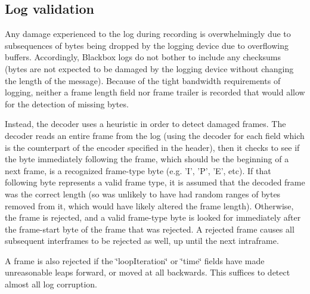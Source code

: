 \subsection*{Log validation}

Any damage experienced to the log during recording is overwhelmingly due to subsequences of bytes being dropped by the logging device due to overflowing buffers. Accordingly, Blackbox logs do not bother to include any checksums (bytes are not expected to be damaged by the logging device without changing the length of the message). Because of the tight bandwidth requirements of logging, neither a frame length field nor frame trailer is recorded that would allow for the detection of missing bytes.

Instead, the decoder uses a heuristic in order to detect damaged frames. The decoder reads an entire frame from the log (using the decoder for each field which is the counterpart of the encoder specified in the header), then it checks to see if the byte immediately following the frame, which should be the beginning of a next frame, is a recognized frame-\/type byte (e.\+g. 'I', 'P', 'E', etc). If that following byte represents a valid frame type, it is assumed that the decoded frame was the correct length (so was unlikely to have had random ranges of bytes removed from it, which would have likely altered the frame length). Otherwise, the frame is rejected, and a valid frame-\/type byte is looked for immediately after the frame-\/start byte of the frame that was rejected. A rejected frame causes all subsequent interframes to be rejected as well, up until the next intraframe.

A frame is also rejected if the \char`\"{}loop\+Iteration\char`\"{} or \char`\"{}time\char`\"{} fields have made unreasonable leaps forward, or moved at all backwards. This suffices to detect almost all log corruption. 
